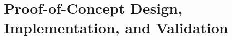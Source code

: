 
\chapter{Proof-of-Concept Design, Implementation, and Validation}
\label{chap:poc_design_validation}






